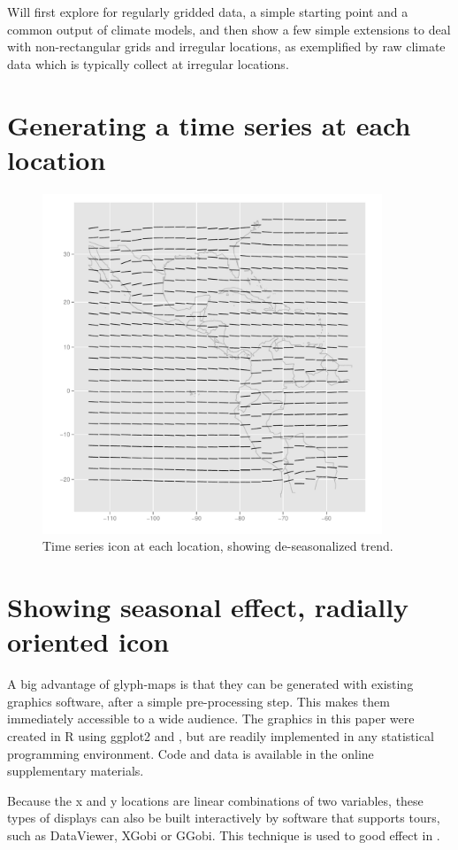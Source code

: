 \documentclass[oneside]{article}
\begin{document}
Will first explore for regularly gridded data, a simple starting point and a common output of climate models, and then show a few simple extensions to deal with non-rectangular grids and irregular locations, as exemplified by raw climate data which is typically collect at irregular locations.
\section{Generating a time series at each location}

\begin{figure}[htp]
\centerline{\includegraphics[width=4in]{nasa-deseas-trend.pdf}}
\caption{Time series icon at each location, showing de-seasonalized trend.}
\end{figure}

\section{Showing seasonal effect, radially oriented icon}

A big advantage of glyph-maps is that they can be generated with existing graphics software, after a simple pre-processing step. This makes them immediately accessible to a wide audience. The graphics in this paper were created in R \citep{R} using ggplot2 \citep{me:ggplot2,wickham:2007d} and \citep{me:plyr}, but are readily implemented in any statistical programming environment.  Code and data is available in the online supplementary materials.

Because the x and y locations are linear combinations of two variables, these types of displays can also be built interactively by software that supports tours, such as DataViewer, XGobi or GGobi.  This technique is used to good effect in \citet{buja:1996a}.
\end{document}
